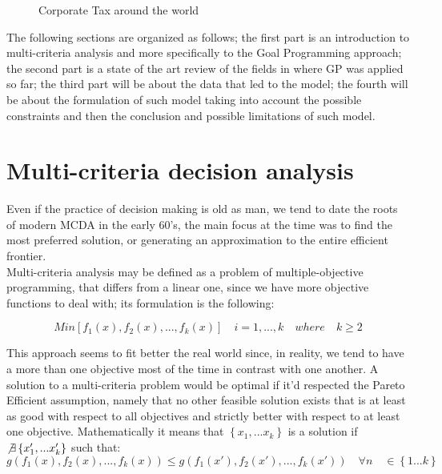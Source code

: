 \documentclass{article}
\begin{document}
\begin{figure}[htb!]
\centering
{}
\caption{Corporate Tax around the world}
\end{figure}

The following sections are organized as follows; the first part is an introduction to multi-criteria analysis and more specifically to the Goal Programming approach; the second part is a state of the art review of the fields in where GP was applied so far; the third part will be about the data that led to the model; the fourth will be about the formulation of such model taking into account the possible constraints and then the conclusion and possible limitations of such model.

\section{Multi-criteria decision analysis}
Even if the practice of decision making is old as man, we tend to date the roots of modern MCDA in the early 60's, the main focus at the time was to find the most preferred solution, or generating an approximation to the entire efficient frontier\cite{greco_multiple_2016}.
\\
Multi-criteria analysis may be defined as a problem of multiple-objective programming, that differs from a linear one,
since we have more objective functions to deal with; its formulation is the following:

\[
Min[f_1(x),f_2(x),...,f_k(x)] \quad i=1,...,k \quad where \quad k\geq2
\]

This approach seems to fit better the real world since, in reality, we tend to have a more than one objective most of the time in contrast with one another. 
A solution to a multi-criteria problem would be optimal if it'd respected the Pareto Efficient assumption, namely that no other feasible solution exists that is at least as good with respect to all objectives and strictly better with respect to at least one objective. Mathematically it means that $\left\{x_1,...x_k\right\}$ is a solution if $\not\exists \left\{x'_1,...x'_k\right\}$
such that:
\[
g(f_1(x),f_2(x),...,f_k(x)) \leq g(f_1(x'),f_2(x'),...,f_k(x')) \quad \forall n \quad \in  \left\{1...k\right\}
\]
\end{document}
